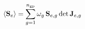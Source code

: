 \documentclass[preview]{standalone}
\begin{document}
\begin{align*}
\special{dvisvgm:raw <g id='unique000'>}\langle\mathbf S_e\rangle \special{dvisvgm:raw </g>}\special{dvisvgm:raw <g id='unique001'>}=\sum_{g=1}^{n_{\rm gp}}\omega_g\,\mathbf S_{e,g}\det\mathbf J_{e,g}\special{dvisvgm:raw </g>}
\end{align*}
\end{document}
